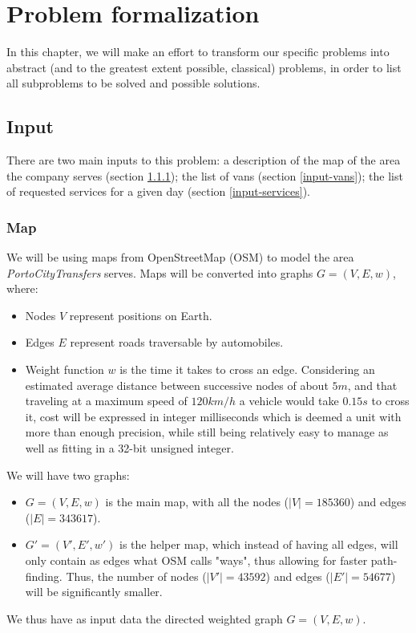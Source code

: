 \chapter{Problem formalization}
In this chapter, we will make an effort to transform our specific problems into abstract (and to the greatest extent possible, classical) problems, in order to list all subproblems to be solved and possible solutions.
\section{Input}
There are two main inputs to this problem: a description of the map of the area the company serves (section \ref{input-map}); the list of vans (section \ref{input-vans}); the list of requested services for a given day (section \ref{input-services}).
\subsection{Map} \label{input-map}
We will be using maps from OpenStreetMap (OSM) to model the area \emph{PortoCityTransfers} serves.
Maps will be converted into graphs $G=(V,E, w)$, where:
\begin{itemize}
    \item Nodes $V$ represent positions on Earth.
    \item Edges $E$ represent roads traversable by automobiles.
    \item Weight function $w$ is the time it takes to cross an edge. Considering an estimated average distance between successive nodes of about $5 m$, and that traveling at a maximum speed of $120 km/h$ a vehicle would take $0.15 s$ to cross it, cost will be expressed in integer milliseconds which is deemed a unit with more than enough precision, while still being relatively easy to manage as well as fitting in a 32-bit unsigned integer.
\end{itemize}
We will have two graphs:
\begin{itemize}
    \item $G=(V,E,w)$ is the main map, with all the nodes ($|V|=185360$) and edges ($|E|=343617$).
    \item $G'=(V',E',w')$ is the helper map, which instead of having all edges, will only contain as edges what OSM calls "ways", thus allowing for faster path-finding. Thus, the number of nodes ($|V'|=43592$) and edges ($|E'|=54677$) will be significantly smaller.
\end{itemize}
We thus have as input data the directed weighted graph $G=(V,E,w)$.
